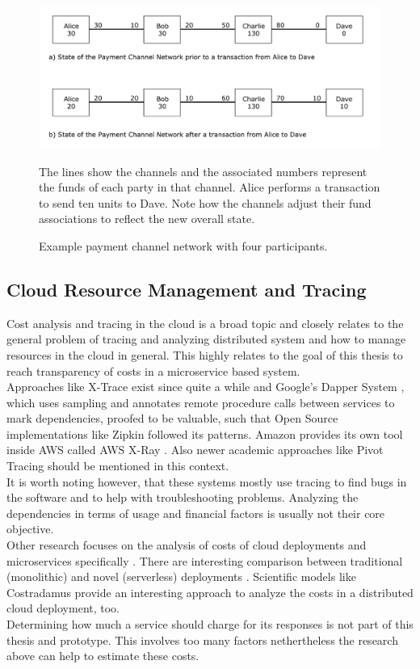 \documentclass[a4paper,12pt]{scrartcl}
\begin{document}
\begin{figure}[H]
\centering
\includegraphics[width=450pt]{Images/PaymentChannelNetwork.pdf}
\caption{Example payment channel network with four participants.}
The lines show the channels and the associated numbers represent the funds of each party in that channel. Alice performs a transaction to send ten units to Dave. Note how the channels adjust their fund associations to reflect the new overall state.
\label{fig:PaymentChannelNetwork}
\end{figure}

\subsection{Cloud Resource Management and Tracing}

Cost analysis and tracing in the cloud is a broad topic and closely relates to the general problem of tracing and analyzing distributed system and how to manage resources in the cloud in general. This highly relates to the goal of this thesis to reach transparency of costs in a microservice based system.\\
Approaches like X-Trace \cite{fonseca2007x} exist since quite a while and Google's Dapper System \cite{Sigelman2010}, which uses sampling and annotates remote procedure calls between services to mark dependencies, proofed to be valuable, such that Open Source implementations like Zipkin \cite{web102} followed its patterns. Amazon provides its own tool inside AWS called AWS X-Ray \cite{web41}. Also newer academic approaches like Pivot Tracing \cite{mace2015pivot} should be mentioned in this context.\\
It is worth noting however, that these systems mostly use tracing to find bugs in the software and to help with troubleshooting problems. Analyzing the dependencies in terms of usage and financial factors is usually not their core objective.\\

Other research focuses on the analysis of costs of cloud deployments \cite{Jennings2015}\cite{Sharma2012} and microservices specifically \cite{Leitner2016}. There are interesting comparison between traditional (monolithic) and novel (serverless) deployments \cite{Villamizar2017}. Scientific models like Costradamus \cite{kuhlenkamp2017costradamus} provide an interesting approach to analyze the costs in a distributed cloud deployment, too.\\
Determining how much a service should charge for its responses is not part of this thesis and prototype. This involves too many factors nethertheless the research above can help to estimate these costs.
\end{document}
